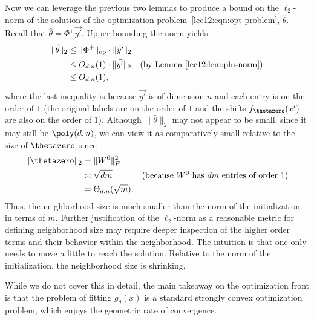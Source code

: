 Now we can leverage the previous two lemmas to produce a bound on the $\ell_2$-norm of the solution of the optimization problem~\eqref{lec12:eqn:opt-problem}, $\hat \theta$. Recall that $\hat \theta = \Phi^+ \vec {y'}$. Upper bounding the norm yields
\begin{align}
    \| \hat \theta\|_2 & \leq \| \Phi^+ \|_{\text{op}} \cdot \|\vec{y'} \|_2  \\
    & \leq O_{d, n} (1) \cdot \|\vec{y'} \|_2 &\text{(by Lemma~\ref{lec12:lem:phi-norm})} \\
    & \leq  O_{d, n} (1),
\end{align}
where the last inequality is because $\vec{y'}$ is of dimension $n$ and each entry is on the order of $1$ (the original labels are on the order of $1$ and the shifts $f_{\thetazero}(x\sp{i})$ are also on the order of $1$). Although $\| \hat \theta\|_2$ may not appear to be small, since it may still be $\poly(d, n)$, we can view it as comparatively small relative to the size of $\thetazero$ since
\begin{align}
    \| \thetazero \|_2 &= \| W^0 \|_F^2 \\
    &\asymp \sqrt {dm} &\text{(because $ W^0$ has $dm$ entries of order $1$)} \\
    &= \Theta_{d, n}(\sqrt m).
\end{align}
Thus, the neighborhood size is much smaller than the norm of the initialization in terms of $m$. Further justification of the $\ell_2$-norm as a reasonable metric for defining neighborhood size may require deeper inspection of the higher order terms and their behavior within the neighborhood. The intuition is that one only needs to move a little to reach the solution. Relative to the norm of the initialization, the neighborhood size is shrinking.

\begin{remark}
While we do not cover this in detail, the main takeaway on the optimization front is that the problem of fitting $g_\theta(x)$ is a standard strongly convex optimization problem, which enjoys the geometric rate of convergence.
\end{remark}



